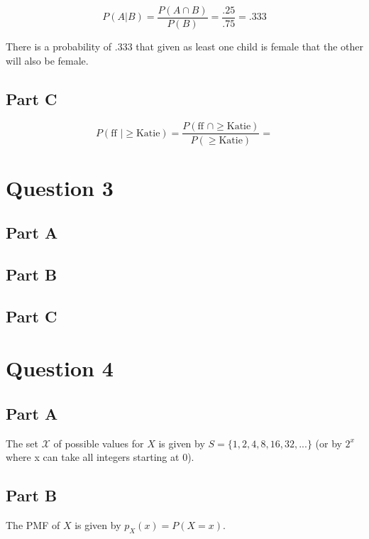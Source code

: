 \documentclass[letterpaper]{article}
\begin{document}
$$P(A|B) = \frac{P(A \cap B)}{P(B)} = \frac{.25}{.75} = .333$$

There is a probability of .333 that given as least one child is female that the other will also be female.

\subsection*{Part C}

$$P(\text{ff } | \geq \text{Katie}) = \frac{P(\text{ff } \cap \geq \text{Katie})}{P(\geq  \text{Katie})} = $$

\newpage

\section*{Question 3}

\subsection*{Part A}

\subsection*{Part B}

\subsection*{Part C}

\newpage

\section*{Question 4}

\subsection*{Part A}

The set $\mathcal{X}$ of possible values for $X$ is given by $S = \{ 1, 2, 4, 8, 16, 32, ...\}$ (or by $2^x$ where x can take all integers starting at 0).

\subsection*{Part B}

The PMF of $X$ is given by $p_{X}(x) = P(X = x)$.
\end{document}

